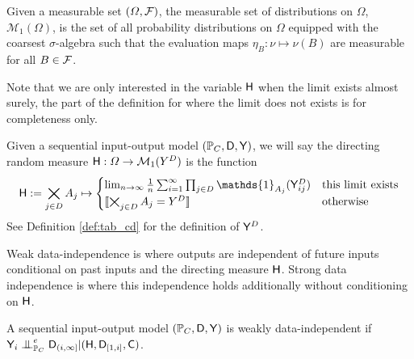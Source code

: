 \begin{definition}
Given a measurable set $(\Omega,\mathcal{F})$, the measurable set of distributions on $\Omega$, $\mathcal{M}_1(\Omega)$, is the set of all probability distributions on $\Omega$ equipped with the coarsest $\sigma$-algebra such that the evaluation maps $\eta_B:\nu\mapsto \nu(B)$ are measurable for all $B\in \mathcal{F}$.
\end{definition}

Note that we are only interested in the variable $\mathsf{H}$ when the limit exists almost surely, the part of the definition for where the limit does not exists is for completeness only.

\begin{definition}\label{def:dir_rand_meas}
Given a sequential input-output model $(\mathbb{P}_C,\mathsf{D},\mathsf{Y})$, we will say the directing random measure $\mathsf{H}:\Omega\to \mathcal{M}_1(Y^D)$ is the function
\begin{align}
    \RV{H} := \bigtimes_{j\in D} A_j \mapsto \begin{cases}
    \lim_{n\to \infty}\frac{1}{n} \sum_{i=1}^{\infty} \prod_{j\in D} \mathds{1}_{A_j}(\RV{Y}^D_{ij}) & \text{this limit exists}\\
    \llbracket \bigtimes_{j\in D} A_j = Y^D \rrbracket &\text{otherwise}
    \end{cases} 
\end{align}
See Definition \ref{def:tab_cd} for the definition of $\mathsf{Y}^D$.
\end{definition}

Weak data-independence is where outputs are independent of future inputs conditional on past inputs and the directing measure $\mathsf{H}$. Strong data independence is where this independence holds additionally without conditioning on $\mathsf{H}$.

\begin{definition}\label{def:weak_di}
A sequential input-output model $(\mathbb{P}_C,\mathsf{D},\mathsf{Y})$ is weakly data-independent if $\RV{Y}_i\CI^e_{\prob{P}_C} \RV{D}_{(i,\infty]}|(\RV{H},\RV{D}_{[1,i]},\RV{C})$.
\end{definition}


